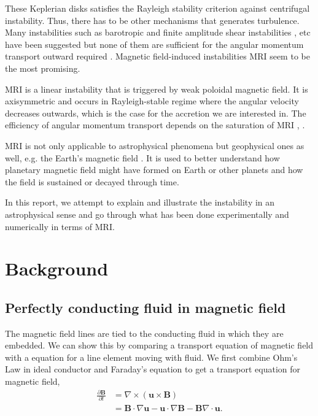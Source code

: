 \documentclass{jfm}
\newcommand{\del}{\nabla}
\begin{document}
These Keplerian disks satisfies the Rayleigh stability criterion
\citep[see][]{Rayleigh1916} against centrifugal instability.  Thus, there has
to be other mechanisms that generates turbulence. Many instabilities such as
barotropic  \cite{Dubrulle2005b} and finite amplitude shear instabilities
\cite{Dubrulle2005a}, \cite{Lesur2005} etc have been suggested but none of them
are sufficient for the angular momentum transport outward required
\cite{Ji2006}. Magnetic field-induced instabilities MRI seem to be the most
promising. 

MRI is a linear instability that is triggered by weak poloidal magnetic field.
It is axisymmetric and occurs in Rayleigh-stable regime where the angular
velocity decreases outwards, which is the case for the accretion we are
interested in. The efficiency of angular momentum transport depends on the
saturation of MRI \cite{Balbus1991}, \cite{Balbus1998}.

MRI is not only applicable to astrophysical phenomena but geophysical ones as
well, e.g. the Earth's magnetic field \cite{Petitdemange2008}. It is used to
better understand how planetary magnetic field might  have formed on Earth or
other planets and how the field is sustained or decayed through time.

In this report, we attempt to explain and illustrate the instability in an
astrophysical sense and go through what has been done experimentally and
numerically in terms of MRI.



\section{Background}

%
%
\subsection{Perfectly conducting fluid in magnetic field}

The magnetic field lines are tied to the conducting fluid in which they are 
embedded. We can show this by comparing a transport equation of magnetic field
with a equation for a line element moving with fluid. We first combine Ohm's 
Law in ideal conductor and Faraday's equation to get a transport equation for 
magnetic field,
\begin{align}
    \frac{\partial \mathbf{B}}{\partial t} &= \del \times (\mathbf{u}\times \mathbf{B}) \nonumber \\
    &=\mathbf{B}\cdot\del \mathbf{u} - {\mathbf{u}\cdot\del}\mathbf{B} -\mathbf{B}\del\cdot\mathbf{u}.
\end{align}
\end{document}
